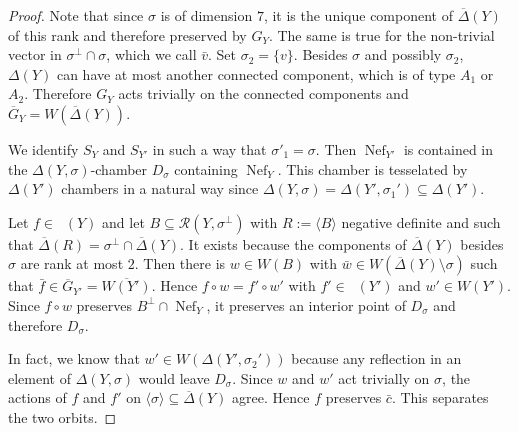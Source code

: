 \documentclass[a4paper]{amsart}
\theoremstyle{definition}
\theoremstyle{plain}
\DeclareMathOperator{\Nef}{Nef}
\DeclareMathOperator{\aut}{Aut^*}
\newcommand{\R}{\mathcal{R}}
\newcommand{\Gbar}{\overline{G}}
\newcommand{\DeltabarY}{\overline{\Delta}(Y)}
\begin{document}
\begin{proof}
Note that since $\sigma$ is of dimension $7$, it is the unique component of $\DeltabarY$ of this rank and therefore preserved by $G_Y$. The same is true for the non-trivial vector in $\sigma^\perp\cap\sigma$, which we call $\bar v$. Set $\sigma_2=\{v\}$. Besides $\sigma$ and possibly $\sigma_2$, $\Delta(Y)$ can have at most another connected component, which is of type $A_1$ or $A_2$. Therefore $G_Y$ acts trivially on the connected components and $\Gbar_Y=W(\DeltabarY)$. 


We identify $S_Y$ and $S_{Y'}$ in such a way that $\sigma'_1=\sigma$. Then $\Nef_{Y'}$ is contained in the $\Delta(Y,\sigma)$-chamber $D_\sigma$ containing $\Nef_{Y}$. This chamber is tesselated by $\Delta(Y')$ chambers in a natural way since $\Delta(Y,\sigma)=\Delta(Y',\sigma_1') \subseteq \Delta(Y')$. 

Let $f \in \aut(Y)$ and let $B\subseteq \R(Y,\sigma^\perp)$ with $R:=\langle B \rangle$ negative definite and such that $\overline{\Delta}(R)=\sigma^\perp \cap \DeltabarY$. It exists because the components of $\DeltabarY$ besides $\sigma$ are rank at most $2$. Then there is $w \in W(B)$ with $\bar w \in W(\overline{\Delta}(Y)\setminus \sigma)$ such that $\bar f \in \Gbar_{Y'}=\overline{W(Y')}$.  Hence $f\circ w=f'\circ w'$ with $f' \in \aut(Y')$ and $w' \in W(Y')$.
Since $f\circ w$ preserves $B^\perp\cap \Nef_Y$, it preserves an interior point of $D_\sigma$ and therefore $D_\sigma$.  

In fact, we know that $w' \in W(\Delta(Y',\sigma_2'))$ because any reflection in an element of $\Delta(Y,\sigma)$ would leave $D_\sigma$. Since $w$ and $w'$ act trivially on $\sigma$, the actions of $f$ and $f'$ on $\langle \sigma \rangle \subseteq \DeltabarY$ agree. Hence $f$ preserves $\bar c$. This separates the two orbits.
\end{proof}
\end{document}
